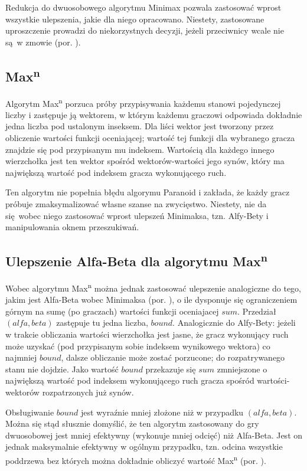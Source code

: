 \documentclass{pracamgr}
\begin{document}
Redukcja do dwuosobowego algorytmu Minimax pozwala zastosować wprost wszystkie ulepszenia, jakie dla niego opracowano.
Niestety, zastosowane uproszczenie prowadzi do niekorzystnych decyzji, jeżeli przeciwnicy wcale nie są w zmowie (por. \cite{sturtevant}).

\subsection{Max\textsuperscript{n}}

Algorytm Max\textsuperscript{n} porzuca próby przypisywania każdemu stanowi pojedynczej liczby i zastępuje ją wektorem, w którym każdemu graczowi odpowiada dokładnie jedna liczba pod ustalonym inseksem.
Dla liści wektor jest tworzony przez obliczenie wartości funkcji oceniającej; wartość tej funkcji dla wybranego gracza znajdzie się pod przypisanym mu indeksem.
Wartością dla każdego innego wierzchołka jest ten wektor spośród wektorów-wartości jego synów, który ma największą wartość pod indeksem gracza wykonującego ruch.

Ten algorytm nie popełnia błędu algorymu Paranoid i zakłada, że każdy gracz próbuje zmaksymalizować własne szanse na zwycięstwo.
Niestety, nie da się wobec niego zastosować wprost ulepszeń Minimaksa, tzn. Alfy-Bety i manipulowania oknem przeszukiwań.

\subsection*{Ulepszenie Alfa-Beta dla algorytmu Max\textsuperscript{n}}

Wobec algorytmu Max\textsuperscript{n} można jednak zastosować ulepszenie analogiczne do tego, jakim jest Alfa-Beta wobec Minimaksa (por. \cite{korf}), o ile dysponuje się ograniczeniem górnym na sumę (po graczach) wartości funkcji oceniajacej \(sum\).
Przedział \((alfa, beta)\) zastępuje tu jedna liczba, \(bound\).
Analogicznie do Alfy-Bety: jeżeli w trakcie obliczania wartości wierzchołka jest jasne, że gracz wykonujący ruch może uzyskać (pod przypisanym sobie indeksem wynikowego wektora) co najmniej \(bound\), dalsze obliczanie może zostać porzucone; do rozpatrywanego stanu nie dojdzie.
Jako wartość \(bound\) przekazuje się \(sum\) zmniejszone o największą wartość pod indeksem wykonującego ruch gracza spośród wartości-wektorów rozpatrzonych już synów.

Obsługiwanie \(bound\) jest wyraźnie mniej złożone niż w przypadku \((alfa, beta)\).
Można się stąd słusznie domyślić, że ten algorytm zastosowany do gry dwuosobowej jest mniej efektywny (wykonuje mniej odcięć) niż Alfa-Beta.
Jest on jednak maksymalnie efektywny w ogólnym przypadku, tzn. odcina wszystkie poddrzewa bez których można dokładnie obliczyć wartość Max\textsuperscript{n} (por. \cite{korf}).
\end{document}
